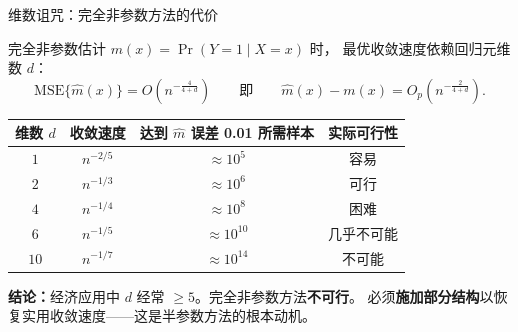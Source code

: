 \documentclass[aspectratio=169, 10pt]{beamer}
\begin{document}
\begin{frame}{维数诅咒：完全非参数方法的代价}

  完全非参数估计 $m(x) = \Pr(Y=1\mid X=x)$ 时，
  最优收敛速度依赖回归元维数 $d$：
  $$\text{MSE}\{\hat m(x)\} = O\!\left(n^{-\frac{4}{4+d}}\right) \qquad
  \text{即} \qquad \hat m(x) - m(x) = O_p\!\left(n^{-\frac{2}{4+d}}\right).$$

  \vspace{-0.5em}
  \begin{center}\footnotesize
  \begin{tabular}{c|c|c|c}
  \hline
  维数 $d$ & 收敛速度 & 达到 $\hat m$ 误差 0.01 所需样本 & 实际可行性 \\
  \hline
  $1$ & $n^{-2/5}$  & $\approx 10^5$  & 容易 \\
  $2$ & $n^{-1/3}$  & $\approx 10^6$  & 可行 \\
  $4$ & $n^{-1/4}$  & $\approx 10^8$  & 困难 \\
  $6$ & $n^{-1/5}$  & $\approx 10^{10}$ & 几乎不可能 \\
  $10$ & $n^{-1/7}$  & $\approx 10^{14}$ & 不可能 \\
  \hline
  \end{tabular}
  \end{center}

  \begin{highlightbox}
    \textbf{结论：}经济应用中 $d$ 经常 $\geq 5$。完全非参数方法\textbf{不可行}。
    必须\textbf{施加部分结构}以恢复实用收敛速度——这是半参数方法的根本动机。
  \end{highlightbox}

\end{frame}
\end{document}
